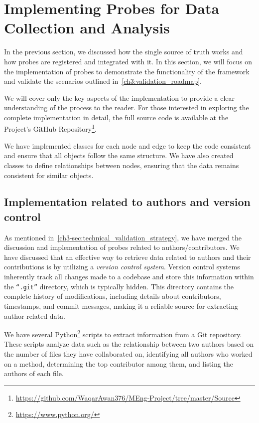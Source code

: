 \section{Implementing Probes for Data Collection and Analysis}\label{sec:probes_implementation}

In the previous section, we discussed how the single source of truth works and how probes are registered and integrated with it. In this section, we will focus on the implementation of probes to demonstrate the functionality of the framework and validate the scenarios outlined in~\autoref{ch3:validation_roadmap}.  

We will cover only the key aspects of the implementation to provide a clear understanding of the process to the reader. For those interested in exploring the complete implementation in detail, the full source code is available at the Project's GitHub Repository\footnote{\url{https://github.com/WaqarAwan376/MEng-Project/tree/master/Source}}.

We have implemented classes for each node and edge to keep the code consistent and ensure that all objects follow the same structure. We have also created classes to define relationships between nodes, ensuring that the data remains consistent for similar objects.

\subsection{Implementation related to authors and version control}

As mentioned in~\autoref{ch3-sec:technical_validation_strategy}, we have merged the discussion and implementation of probes related to authors/contributors. We have discussed that an effective way to retrieve data related to authors and their contributions is by utilizing a \textit{version control system}. Version control systems inherently track all changes made to a codebase and store this information within the \texttt{``.git''} directory, which is typically hidden. This directory contains the complete history of modifications, including details about contributors, timestamps, and commit messages, making it a reliable source for extracting author-related data.

We have several Python\footnote{\url{https://www.python.org/}} scripts to extract information from a Git repository. These scripts analyze data such as the relationship between two authors based on the number of files they have collaborated on, identifying all authors who worked on a method, determining the top contributor among them, and listing the authors of each file.

